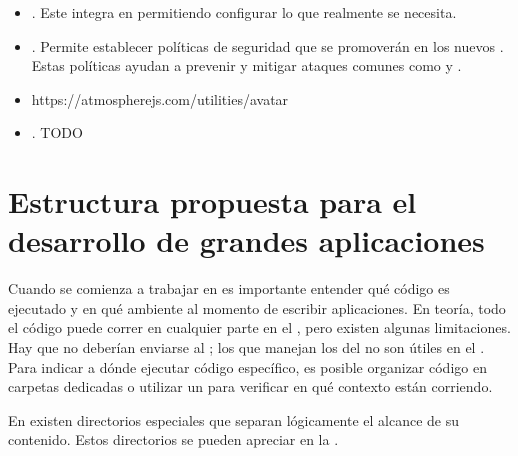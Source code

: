 \begin{itemize}
		\item
			\textbf{\bootstrapPackage}. Este \packageAS integra \bootstrapNAME en \meteorNAME permitiendo configurar lo que realmente se necesita.
		\item
			\textbf{\browserPolicyPackage}. Permite establecer políticas de seguridad que se promoverán en los nuevos \browsersINT. Estas políticas ayudan a prevenir y mitigar ataques comunes como \crossSiteScriptingINT y \clickjackingINT.
		\item
			https://atmospherejs.com/utilities/avatar
		\item
			\textbf{\alanningRolesPackage}. TODO
			
	\end{itemize}


\section{Estructura propuesta para el desarrollo de grandes aplicaciones}\label{cap:arquitectura:section:generic_architecture_structure}

Cuando se comienza a trabajar en \meteorNAME es importante entender qué código es ejecutado y en qué ambiente al momento de escribir aplicaciones. En teoría, todo el código puede correr en cualquier parte en el \stackAS, pero existen algunas limitaciones. Hay \apikeyAS que no deberían enviarse al \clientAS; los \events que manejan los \clicksPC del \mousePC no son útiles en el \serverAS. Para indicar a \meteorNAME dónde ejecutar código específico, es posible organizar código en carpetas dedicadas o utilizar un \checkCPT para verificar en qué contexto están corriendo.

En \meteorNAME existen directorios especiales que separan lógicamente el alcance de su contenido. Estos directorios se pueden apreciar en la .


